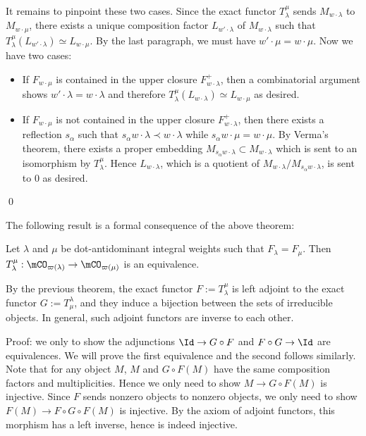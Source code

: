 		It remains to pinpoint these two cases. Since the exact functor $T_\lambda^\mu$ sends $ M_{w\cdot \lambda} $ to $M_{w\cdot \mu}$, there exists a unique composition factor $L_{w'\cdot \lambda}$ of $M_{w\cdot \lambda} $ such that $T_\lambda^\mu(L_{w'\cdot \lambda})\simeq L_{w\cdot \mu}$. By the last paragraph, we must have $w'\cdot \mu = w\cdot \mu$. Now we have two cases:
		\begin{itemize}
			\item 
				If $F_{w\cdot \mu}$ is contained in the upper closure $F_{w\cdot \lambda}^+$, then a combinatorial argument shows $w'\cdot \lambda = w\cdot \lambda$ and therefore $T_\lambda^\mu(L_{w\cdot \lambda})\simeq L_{w\cdot \mu}$ as desired.
			\item
				If $F_{w\cdot \mu}$ is not contained in the upper closure $F_{w\cdot \lambda}^+$, then there exists a reflection $s_\alpha$ such that $s_{\alpha}w\cdot \lambda\prec w\cdot\lambda$ while $s_{\alpha}w\cdot \mu = w\cdot\mu$. By Verma's theorem, there exists a proper embedding $M_{s_{\alpha}w\cdot \lambda} \subset M_{w\cdot\lambda}$ which is sent to an isomorphism by $T_\lambda^\mu$. Hence $L_{w\cdot \lambda}$, which is a quotient of $M_{w\cdot\lambda}/M_{s_{\alpha}w\cdot \lambda} $, is sent to 0 as desired.
		\end{itemize}

	\qed

	The following result is a formal consequence of the above theorem:

	\begin{thm}
		\label{thm-tranlation-equiv}
		Let $\lambda$ and $\mu$ be dot-antidominant integral weights such that $F_\lambda=F_\mu$. Then $T_\lambda^\mu: \mCO_{\varpi(\lambda)} \to  \mCO_{\varpi(\mu)}$ is an equivalence.
	\end{thm}

	\proof
		By the previous theorem, the exact functor $F:=T_\lambda^\mu$ is left adjoint to the exact functor $G:=T_\mu^\lambda$, and they induce a bijection between the sets of irreducible objects. In general, such adjoint functors are inverse to each other. 

		Proof: we only to show the adjunctions $\Id \to G\circ F$ and $F\circ G \to \Id$ are equivalences. We will prove the first equivalence and the second follows similarly. Note that for any object $M$, $M$ and $G\circ F(M)$ have the same composition factors and multiplicities. Hence we only need to show $M \to G\circ F(M)$ is injective. Since $F$ sends nonzero objects to nonzero objects, we only need to show $F(M) \to F\circ G\circ F(M)$ is injective. By the axiom of adjoint functors, this morphism has a left inverse, hence is indeed injective.

